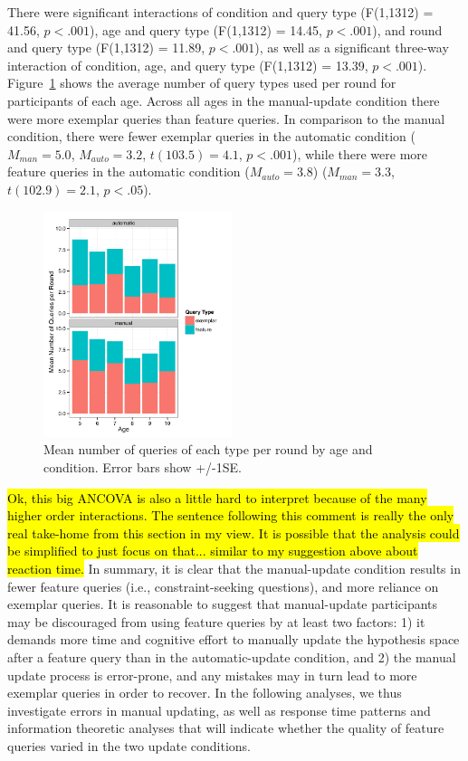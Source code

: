 \documentclass[10pt,letterpaper]{article}
\begin{document}
There were significant interactions of condition and query type (F(1,1312) = 41.56, 
$p<.001$), age and query type (F(1,1312) = 14.45, $p<.001$), and round and query 
type (F(1,1312) = 11.89, $p<.001$), as well as a significant three-way interaction of 
condition, age, and query type (F(1,1312) = 13.39, $p<.001$). Figure~\ref{fig:clicks-per-agecond} 
shows the average number of query types used per round for 
participants of each age. Across all ages in the manual-update condition there were 
more exemplar queries than feature queries. In comparison to the manual condition, 
there were fewer exemplar queries in the automatic condition ($M_{man} = 5.0$, 
$M_{auto} = 3.2$, $t(103.5)=4.1$, $p<.001$), while there were more feature queries 
in the automatic condition ($M_{auto} = 3.8$) ($M_{man} = 3.3$, $t(102.9)=2.1$, 
$p<.05$). 

\begin{figure}[h]
  \centering
  \includegraphics[width=0.49\textwidth]{figures/clicks_by_age_condition_query_type}
  \caption{Mean number of queries of each type per round by age and condition. 
Error bars show +/-1SE.}
  \label{fig:clicks-per-agecond}
\end{figure} 

\hl{Ok, this big ANCOVA is also a little hard to interpret because of the many
higher order interactions.  The sentence following this comment is really the only
real take-home from this section in my view.  It is possible that the analysis could
be simplified to just focus on that... similar to my suggestion above about reaction time.}
In summary, it is clear that the manual-update condition results in fewer feature 
queries (i.e., constraint-seeking questions), and more reliance on exemplar queries. 
It is reasonable to suggest that manual-update participants may be discouraged 
from using feature queries by at least two factors: 1) it demands more time and 
cognitive effort to manually update the hypothesis space after a feature query than 
in the automatic-update condition, and 2) the manual update process is error-prone, 
and any mistakes may in turn lead to more exemplar queries in order to recover. In 
the following analyses, we thus investigate errors in manual updating, as well as 
response time patterns and information theoretic analyses that will indicate whether 
the quality of feature queries varied in the two update conditions.
\end{document}
